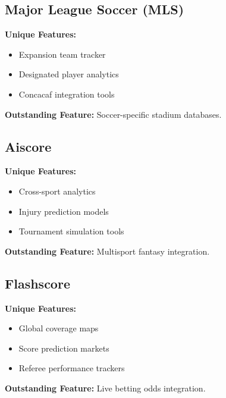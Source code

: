 \documentclass{report}
\begin{document}
\subsection{Major League Soccer (MLS)}
\textbf{Unique Features:}
\begin{itemize}
    \item Expansion team tracker
    \item Designated player analytics
    \item Concacaf integration tools
\end{itemize}
\textbf{Outstanding Feature:} Soccer-specific stadium databases\citep{mls}.

\subsection{Aiscore}
\textbf{Unique Features:}
\begin{itemize}
    \item Cross-sport analytics
    \item Injury prediction models
    \item Tournament simulation tools
\end{itemize}
\textbf{Outstanding Feature:} Multisport fantasy integration\citep{aiscore}.

\subsection{Flashscore}
\textbf{Unique Features:}
\begin{itemize}
    \item Global coverage maps
    \item Score prediction markets
    \item Referee performance trackers
\end{itemize}
\textbf{Outstanding Feature:} Live betting odds integration\citep{flashscore}.
\end{document}
